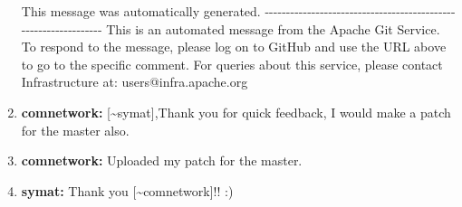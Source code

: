 \documentclass{report}%
\begin{document}
\begin{enumerate}
  \newline%
  \newline%
   This message was automatically generated.\newline%
\newline%
  \newline%
  \newline%
\newline%
{-}{-}{-}{-}{-}{-}{-}{-}{-}{-}{-}{-}{-}{-}{-}{-}{-}{-}{-}{-}{-}{-}{-}{-}{-}{-}{-}{-}{-}{-}{-}{-}{-}{-}{-}{-}{-}{-}{-}{-}{-}{-}{-}{-}{-}{-}{-}{-}{-}{-}{-}{-}{-}{-}{-}{-}{-}{-}{-}{-}{-}{-}{-}{-}\newline%
This is an automated message from the Apache Git Service.\newline%
To respond to the message, please log on to GitHub and use the\newline%
URL above to go to the specific comment.\newline%
\newline%
For queries about this service, please contact Infrastructure at:\newline%
users@infra.apache.org\newline%
%
\item%
\textbf{comnetwork: }{[}\textasciitilde{}symat{]},Thank you for quick feedback, I would make a patch for the master also.%
\item%
\textbf{comnetwork: }Uploaded my patch for the master.%
\item%
\textbf{symat: }Thank you {[}\textasciitilde{}comnetwork{]}!! :)%
\end{enumerate}

%
\end{document}
